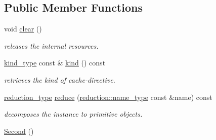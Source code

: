 \subsection*{Public Member Functions}
\begin{DoxyCompactItemize}
\item 
\hypertarget{classhryky_1_1http_1_1header_1_1cache_1_1directive_1_1_second_a07502f6efd33982968d51b776cd39de9}{void \hyperlink{classhryky_1_1http_1_1header_1_1cache_1_1directive_1_1_second_a07502f6efd33982968d51b776cd39de9}{clear} ()}\label{classhryky_1_1http_1_1header_1_1cache_1_1directive_1_1_second_a07502f6efd33982968d51b776cd39de9}

\begin{DoxyCompactList}\small\item\em releases the internal resources. \end{DoxyCompactList}\item 
\hypertarget{classhryky_1_1http_1_1header_1_1cache_1_1directive_1_1_second_a0c0fa7cf386959abd9aa465ad24a14d4}{\hyperlink{classhryky_1_1_kind}{kind\-\_\-type} const \& \hyperlink{classhryky_1_1http_1_1header_1_1cache_1_1directive_1_1_second_a0c0fa7cf386959abd9aa465ad24a14d4}{kind} () const }\label{classhryky_1_1http_1_1header_1_1cache_1_1directive_1_1_second_a0c0fa7cf386959abd9aa465ad24a14d4}

\begin{DoxyCompactList}\small\item\em retrieves the kind of cache-\/directive. \end{DoxyCompactList}\item 
\hypertarget{classhryky_1_1http_1_1header_1_1cache_1_1directive_1_1_second_a8419ca5834ca77c270863de35b45331c}{\hyperlink{namespacehryky_a343a9a4c36a586be5c2693156200eadc}{reduction\-\_\-type} \hyperlink{classhryky_1_1http_1_1header_1_1cache_1_1directive_1_1_second_a8419ca5834ca77c270863de35b45331c}{reduce} (\hyperlink{namespacehryky_1_1reduction_ac686c30a4c8d196bbd0f05629a6b921f}{reduction\-::name\-\_\-type} const \&name) const }\label{classhryky_1_1http_1_1header_1_1cache_1_1directive_1_1_second_a8419ca5834ca77c270863de35b45331c}

\begin{DoxyCompactList}\small\item\em decomposes the instance to primitive objects. \end{DoxyCompactList}\item 
\hypertarget{classhryky_1_1http_1_1header_1_1cache_1_1directive_1_1_second_aac241dab0e51ec5831c387394d827a84}{\hyperlink{classhryky_1_1http_1_1header_1_1cache_1_1directive_1_1_second_aac241dab0e51ec5831c387394d827a84}{Second} ()}\label{classhryky_1_1http_1_1header_1_1cache_1_1directive_1_1_second_aac241dab0e51ec5831c387394d827a84}


\end{DoxyCompactItemize}
